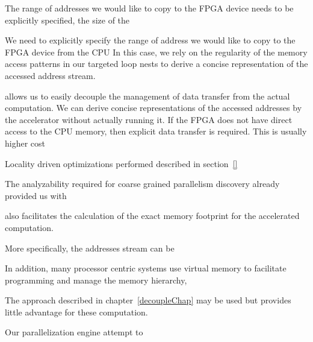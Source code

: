 The range of addresses we would like to copy
to the FPGA device needs to be explicitly specified, the size of the


We need to explicitly specify the range of address we would like to copy to the
FPGA device from the CPU
In this case, we rely on the regularity of the memory access patterns in our targeted loop nests to derive a concise representation of the accessed address stream. 




allows us to easily decouple the management of data transfer from the actual computation.
We can derive concise representations of the accessed addresses by the accelerator without actually running it. 
If the FPGA does not have direct access to the CPU memory, then explicit
data transfer is required. This is usually higher cost






Locality driven optimizations performed
described in section~\ref{}




The analyzability required for coarse grained parallelism discovery 
already provided us with 

also
facilitates the calculation of the exact memory footprint for the accelerated computation. 


More specifically, the addresses stream can be 




In addition, many processor centric systems 
use virtual memory to facilitate programming and manage the memory hierarchy, 






The approach described in chapter~\ref{decoupleChap} may be used but provides little advantage for these computation. 






 



Our parallelization engine attempt to  

